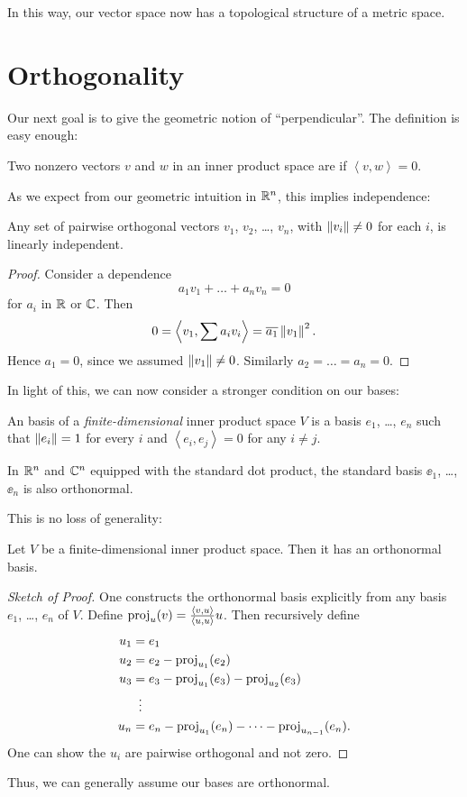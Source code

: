 In this way, our vector space now has a topological structure of a metric space.

\section{Orthogonality}
Our next goal is to give the geometric notion of ``perpendicular''.
The definition is easy enough:
\begin{definition}
	Two nonzero vectors $v$ and $w$ in an inner product space
	are  if $\left< v,w \right> = 0$.
\end{definition}

As we expect from our geometric intuition in $\mathbb R^n$,
this implies independence:
\begin{lemma}
	Any set of pairwise orthogonal vectors $v_1$, $v_2$, \dots, $v_n$,
	with $\left\lVert v_i \right\rVert \neq 0$ for each $i$,
	is linearly independent.
\end{lemma}
\begin{proof}
	Consider a dependence
	\[ a_1 v_1 + \dots + a_n v_n = 0 \]
	for $a_i$ in $\mathbb R$ or $\mathbb C$.
	Then \[ 0 = \left< v_1, \sum a_i v_i \right> = \overline{a_1} \left\lVert v_1 \right\rVert^2. \]
	Hence $a_1 = 0$, since we assumed $\left\lVert v_1 \right\rVert \neq 0$.
	Similarly $a_2 = \dots = a_n = 0$.
\end{proof}

In light of this, we can now consider a stronger condition on our bases:
\begin{definition}
	An  basis of a
	\emph{finite-dimensional} inner product space $V$
	is a basis $e_1$, \dots, $e_n$ such that
	$\left\lVert e_i \right\rVert = 1$ for every $i$ and
	$\left< e_i, e_j \right> = 0$ for any $i \neq j$.
\end{definition}
\begin{example}
	In $\mathbb R^n$ and $\mathbb C^n$ equipped with the standard dot product,
	the standard basis $\ee_1$, \dots, $\ee_n$ is also orthonormal.
\end{example}
This is no loss of generality:
\begin{theorem}
	Let $V$ be a finite-dimensional inner product space.
	Then it has an orthonormal basis.
\end{theorem}
\begin{proof}[Sketch of Proof]
	One constructs the orthonormal basis explicitly from any basis
	$e_1$, \dots, $e_n$ of $V$.
	Define $\operatorname{proj}_u(v) = \frac{\left< v,u\right>}{\left< u,u\right>} u$.
	Then recursively define
	\begin{align*}
		u_1 &= e_1 \\
		u_2 &= e_2 - \opname{proj}_{u_1}(e_2) \\
		u_3 &= e_3 - \opname{proj}_{u_1}(e_3) - \opname{proj}_{u_2}(e_3) \\
		&\vdotswithin{=} \\
		u_n &= e_n - \opname{proj}_{u_1}(e_n) - \dots - \opname{proj}_{u_{n-1}}(e_n).
	\end{align*}
	One can show the $u_i$ are pairwise orthogonal and not zero.
\end{proof}
Thus, we can generally assume our bases are orthonormal.

